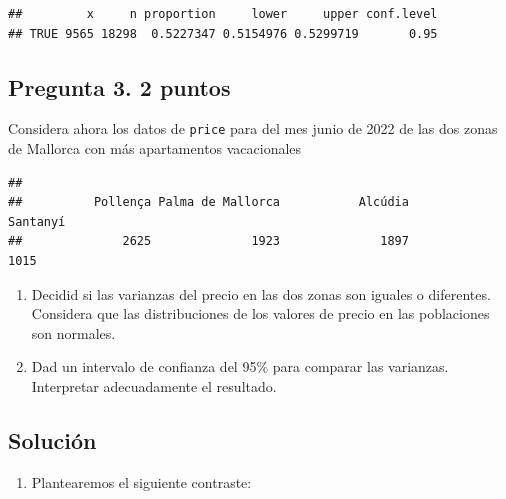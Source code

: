\documentclass[
]{article}
\newenvironment{Shaded}{\begin{snugshade}}{\end{snugshade}}
\newcommand{\AttributeTok}[1]{\textcolor[rgb]{0.77,0.63,0.00}{#1}}
\newcommand{\ConstantTok}[1]{\textcolor[rgb]{0.00,0.00,0.00}{#1}}
\newcommand{\DecValTok}[1]{\textcolor[rgb]{0.00,0.00,0.81}{#1}}
\newcommand{\FunctionTok}[1]{\textcolor[rgb]{0.00,0.00,0.00}{#1}}
\newcommand{\NormalTok}[1]{#1}
\newcommand{\SpecialCharTok}[1]{\textcolor[rgb]{0.00,0.00,0.00}{#1}}
\providecommand{\tightlist}{%
  \setlength{\itemsep}{0pt}\setlength{\parskip}{0pt}}
\begin{document}
\begin{verbatim}
##         x     n proportion     lower     upper conf.level
## TRUE 9565 18298  0.5227347 0.5154976 0.5299719       0.95
\end{verbatim}

\hypertarget{pregunta-3.-2-puntos}{%
\subsection{\texorpdfstring{Pregunta 3. \textbf{2
puntos}}{Pregunta 3. 2 puntos}}\label{pregunta-3.-2-puntos}}

Considera ahora los datos de \texttt{price} para del mes junio de 2022
de las dos zonas de Mallorca con más apartamentos vacacionales

\begin{Shaded}
\end{Shaded}

\begin{verbatim}
## 
##          Pollença Palma de Mallorca           Alcúdia          Santanyí 
##              2625              1923              1897              1015
\end{verbatim}

\begin{enumerate}
\def\labelenumi{\alph{enumi}.}
\tightlist
\item
  Decidid si las varianzas del precio en las dos zonas son iguales o
  diferentes. Considera que las distribuciones de los valores de precio
  en las poblaciones son normales.
\item
  Dad un intervalo de confianza del 95\% para comparar las varianzas.
  Interpretar adecuadamente el resultado.
\end{enumerate}

\hypertarget{soluciuxf3n-2}{%
\subsection{Solución}\label{soluciuxf3n-2}}

\begin{enumerate}
\def\labelenumi{\alph{enumi})}
\tightlist
\item
  Plantearemos el siguiente contraste:
\end{enumerate}
\end{document}
